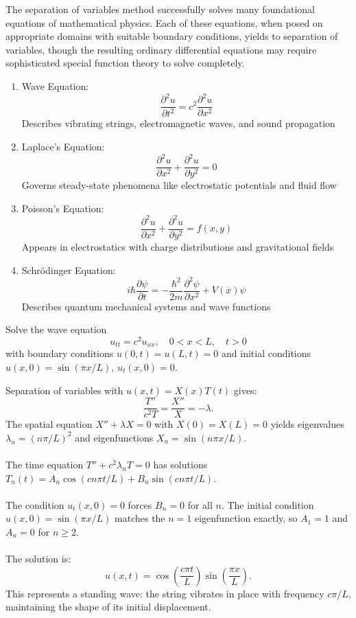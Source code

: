 \noindent The separation of variables method successfully solves many foundational equations of mathematical physics. Each of these equations, when posed on appropriate domains with suitable boundary conditions, yields to separation of variables, though the resulting ordinary differential equations may require sophisticated special function theory to solve completely.

\begin{enumerate}
   \item Wave Equation:
   \[
   \frac{\partial^2 u}{\partial t^2} = c^2\frac{\partial^2 u}{\partial x^2}
   \]
   Describes vibrating strings, electromagnetic waves, and sound propagation
   
   \item Laplace's Equation:
   \[
   \frac{\partial^2 u}{\partial x^2} + \frac{\partial^2 u}{\partial y^2} = 0
   \]
   Governs steady-state phenomena like electrostatic potentials and fluid flow
   
   \item Poisson's Equation:
   \[
   \frac{\partial^2 u}{\partial x^2} + \frac{\partial^2 u}{\partial y^2} = f(x,y)
   \]
   Appears in electrostatics with charge distributions and gravitational fields
   
   \item Schrödinger Equation:
   \[
   i\hbar\frac{\partial \psi}{\partial t} = -\frac{\hbar^2}{2m}\frac{\partial^2 \psi}{\partial x^2} + V(x)\psi
   \]
   Describes quantum mechanical systems and wave functions

\end{enumerate}

\exampleline
\begin{example}
Solve the wave equation
\[ u_{tt} = c^2 u_{xx}, \quad 0 < x < L, \quad t > 0 \]
with boundary conditions \( u(0,t) = u(L,t) = 0 \) and initial conditions \( u(x,0) = \sin(\pi x / L) \), \( u_t(x,0) = 0 \).

\begin{solution}
Separation of variables with \( u(x,t) = X(x)T(t) \) gives:
\[ \frac{T''}{c^2 T} = \frac{X''}{X} = -\lambda. \]
The spatial equation \( X'' + \lambda X = 0 \) with \( X(0) = X(L) = 0 \) yields eigenvalues \( \lambda_n = (n\pi/L)^2 \) and eigenfunctions \( X_n = \sin(n\pi x/L) \).\\ \\
\noindent The time equation \( T'' + c^2\lambda_n T = 0 \) has solutions \( T_n(t) = A_n \cos(cn\pi t/L) + B_n \sin(cn\pi t/L) \).\\ \\
\noindent The condition \( u_t(x,0) = 0 \) forces \( B_n = 0 \) for all \( n \). The initial condition \( u(x,0) = \sin(\pi x/L) \) matches the \( n=1 \) eigenfunction exactly, so \( A_1 = 1 \) and \( A_n = 0 \) for \( n \geq 2 \).\\ \\
\noindent The solution is:
\[ u(x,t) = \cos\left(\frac{c\pi t}{L}\right) \sin\left(\frac{\pi x}{L}\right). \]
This represents a standing wave: the string vibrates in place with frequency \( c\pi/L \), maintaining the shape of its initial displacement.
\end{solution}
\end{example}
\exampleline

